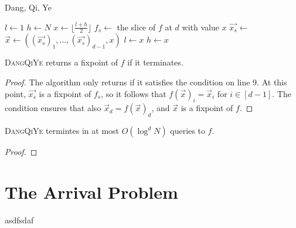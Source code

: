 \begin{algorithm}[t]
  \caption{Dang, Qi, Ye}
  \begin{algorithmic}[1]
  \State $l \gets 1$
  \State $h \gets N$
    \State $x \gets \lfloor \frac{l + h}{2} \rfloor$
    \State $f_s \gets$ the slice of $f$ at $d$ with value $x$
    \State $\vec{x_s} \gets$ 
    \State $\vec{x} \gets ((\vec{x_s})_1, ..., (\vec{x_s})_{d-1}, x)$
      \State {}
    \EndIf
      \State $l \gets x$
    \EndIf
      \State $h \gets x$
    \EndIf
  \EndWhile
  \EndProcedure
  \end{algorithmic}
\end{algorithm}

\begin{lemma}
  \textsc{DangQiYe} returns a fixpoint of $f$ if it terminates.
\end{lemma}
\begin{proof}
  The algorithm only returns if it satisfies the condition on line 9. At this point, $\vec{x_s}$ is a fixpoint
  of $f_s$, so it follows that $f(\vec{x})_i = \vec{x}_i$ for $i \in [d-1]$. The condition ensures
  that also $\vec{x}_d = f(\vec{x})_d$, and $\vec{x}$ is a fixpoint of $f$.
\end{proof}
\begin{lemma}
  \textsc{DangQiYe} termintes in at most $O(\log^d N)$ queries to $f$.
\end{lemma}
\begin{proof}
\end{proof}
\newpage
\section{The Arrival Problem}
asdfsdaf
